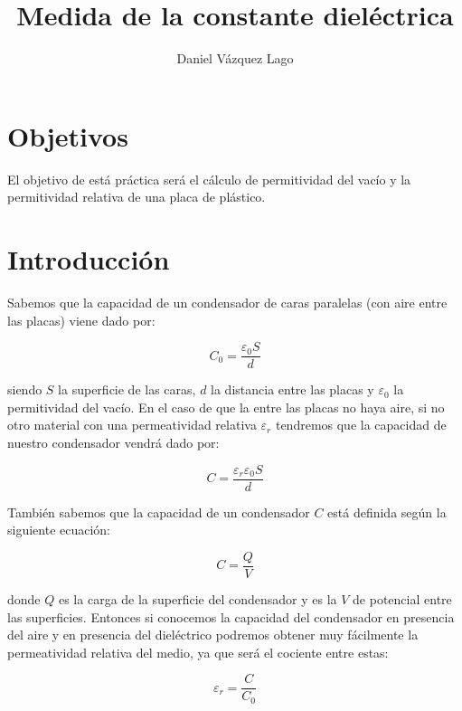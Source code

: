 \documentclass[12pt,a4paper]{article}
\author{Daniel Vázquez Lago}
\title{Medida de la constante dieléctrica}
\begin{document}
\maketitle

\newpage

\tableofcontents

\newpage

\section{Objetivos}

El objetivo de está práctica será el cálculo de permitividad del vacío y la permitividad relativa de una placa de plástico. 

\section{Introducción}

Sabemos que la capacidad de un condensador de caras paralelas (con aire entre las placas) viene dado por:

\begin{equation}
C_0 = \dfrac{\varepsilon_0 S}{d} \label{Ec:1}
\end{equation}

siendo $S$ la superficie de las caras, $d$ la distancia entre las placas y $\varepsilon_0$ la permitividad del vacío. En el caso de que la entre las placas no haya aire, si no otro material con una permeatividad relativa $\varepsilon_r$ tendremos que la capacidad de nuestro condensador vendrá dado por:

\begin{equation}
C = \dfrac{\varepsilon_r \varepsilon_0 S}{d} \label{Ec:2}
\end{equation}

También sabemos que la capacidad de un condensador $C$ está definida según la  siguiente ecuación:

\begin{equation}
C = \dfrac{Q}{V} \label{Ec:3}
\end{equation}

donde $Q$ es la carga de la superficie del condensador y es la $V$ de potencial entre las superficies. Entonces si conocemos la capacidad del condensador en presencia del aire y en presencia del dieléctrico podremos obtener muy fácilmente la permeatividad relativa del medio, ya que será el cociente entre estas:

\begin{equation}
\varepsilon_r = \dfrac{C}{C_0} \label{Ec:cociente}
\end{equation}
\end{document}
